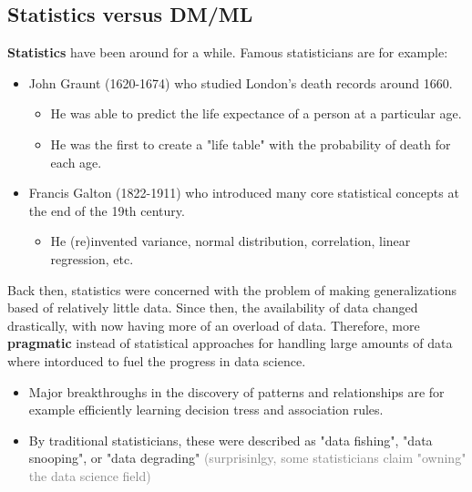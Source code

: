 \subsection{Statistics versus DM/ML}

\textbf{Statistics} have been around for a while. Famous statisticians are for example:
\begin{itemize}
  \item John Graunt (1620-1674) who studied London's death records around 1660.
  \begin{itemize}
    \item He was able to predict the life expectance of a person at a particular age.
    \item He was the first to create a "life table" with the probability of death for each age.
  \end{itemize}
  \item Francis Galton (1822-1911) who introduced many core statistical concepts at the end of the 19th century.
  \begin{itemize}
    \item He (re)invented variance, normal distribution, correlation, linear regression, etc.
  \end{itemize}
\end{itemize}

Back then, statistics were concerned with the problem of making generalizations based of relatively little data. Since then, the availability of data changed drastically, with now having more of an overload of data. Therefore, more \textbf{pragmatic} instead of statistical approaches for handling large amounts of data where intorduced to fuel the progress in data science.
\begin{itemize}
  \item Major breakthroughs in the discovery of patterns and relationships are for example efficiently learning decision tress and association rules.
  \item By traditional statisticians, these were described as "data fishing", "data snooping", or "data degrading" \textcolor{gray}{\footnotesize(surprisinlgy, some statisticians claim "owning" the data science field)}
\end{itemize}

